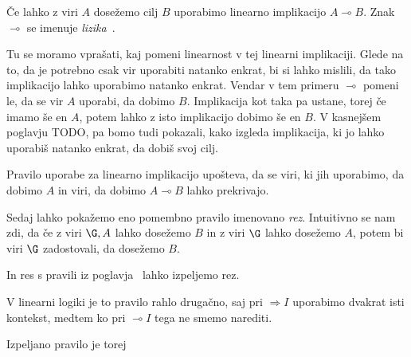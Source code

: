 \cite[poglavje 1.2]{barber1997linear}
Če lahko z viri \(A\) dosežemo cilj \(B\) uporabimo linearno implikacijo \(A \multimap B\). Znak \(\multimap\) se imenuje \emph{lizika}~\cite[L20.3]{truthIsEphemeral}.
%
\begin{prooftree}
\end{prooftree}
%
Tu se moramo vprašati, kaj pomeni linearnost v tej linearni implikaciji. Glede na to, da je potrebno csak vir uporabiti natanko enkrat, bi si lahko mislili, da tako implikacijo lahko uporabimo natanko enkrat. Vendar v tem primeru \(\multimap\) pomeni le, da se vir \(A\) uporabi, da dobimo \(B\). Implikacija kot taka pa ustane, torej če imamo še en \(A\), potem lahko z isto implikacijo dobimo še en \(B\).
V kasnejšem poglavju TODO, pa bomo tudi pokazali, kako izgleda implikacija, ki jo lahko uporabiš natanko enkrat, da dobiš svoj cilj.
%
\begin{prooftree}
\end{prooftree}
%
Pravilo uporabe za linearno implikacijo upošteva, da se viri, ki jih uporabimo, da dobimo \(A\) in viri, da dobimo \(A \multimap B\) lahko prekrivajo.

Sedaj lahko pokažemo eno pomembno pravilo imenovano \emph{rez}. Intuitivno se nam zdi, da če z viri \(\G, A\) lahko dosežemo \(B\)  in z viri \(\G\) lahko dosežemo \(A\), potem bi viri \(\G\) zadostovali, da dosežemo \(B\).
%
\begin{prooftree}
\end{prooftree}
%
In res s pravili iz poglavja~ lahko izpeljemo rez.
%
\begin{prooftree}
\end{prooftree}
%
V linearni logiki je to pravilo rahlo drugačno, saj pri \(\Rightarrow I\) uporabimo dvakrat isti kontekst, medtem ko pri \(\multimap I\) tega ne smemo narediti.
%
\begin{prooftree}
\end{prooftree}
%
Izpeljano pravilo je torej
%
\begin{prooftree}
\end{prooftree}

